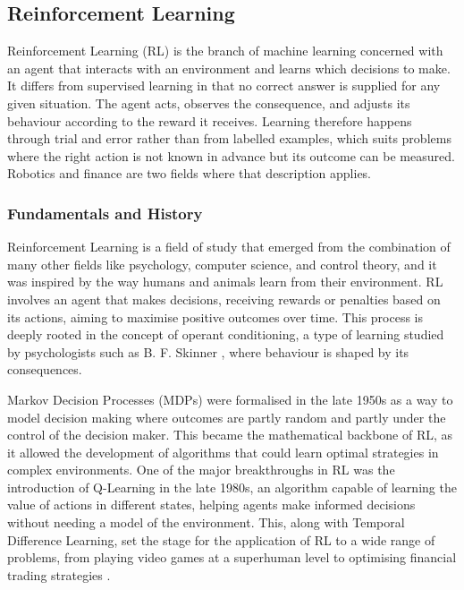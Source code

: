 \subsection{Reinforcement Learning}
\label{Subsection:ReinforcementLearning}

Reinforcement Learning (RL) is the branch of machine learning concerned with an agent that interacts with an environment and learns which decisions to make. It differs from supervised learning in that no correct answer is supplied for any given situation. The agent acts, observes the consequence, and adjusts its behaviour according to the reward it receives. Learning therefore happens through trial and error rather than from labelled examples, which suits problems where the right action is not known in advance but its outcome can be measured. Robotics and finance are two fields where that description applies.

\subsubsection{Fundamentals and History}

Reinforcement Learning is a field of study that emerged from the combination of many other fields like psychology, computer science, and control theory, and it was inspired by the way humans and animals learn from their environment. RL involves an agent that makes decisions, receiving rewards or penalties based on its actions, aiming to maximise positive outcomes over time. This process is deeply rooted in the concept of operant conditioning, a type of learning studied by psychologists such as B. F. Skinner \cite{skinner_operant_1963}, where behaviour is shaped by its consequences.

Markov Decision Processes (MDPs) were formalised in the late 1950s as a way to model decision making where outcomes are partly random and partly under the control of the decision maker. This became the mathematical backbone of RL, as it allowed the development of algorithms that could learn optimal strategies in complex environments. One of the major breakthroughs in RL was the introduction of Q-Learning in the late 1980s, an algorithm capable of learning the value of actions in different states, helping agents make informed decisions without needing a model of the environment. This, along with Temporal Difference Learning, set the stage for the application of RL to a wide range of problems, from playing video games at a superhuman level to optimising financial trading strategies \cite{sutton_reinforcement_2018}.

